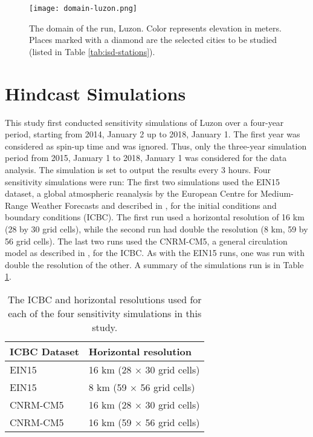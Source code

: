 		\begin{figure}
			\centering
			\texttt{[image: domain-luzon.png]}
			\caption{
				The domain of the run, Luzon.
				Color represents elevation in meters.
				Places marked with a diamond are the selected cities to be studied (listed in Table \ref{tab:isd-stations}).
			}
			\label{fig:domain-luzon}
		\end{figure}	
		
	
\section{Hindcast Simulations}
	This study first conducted sensitivity simulations of Luzon over a four-year period, starting from 2014, January 2 up to 2018, January 1.
	The first year was considered as spin-up time and was ignored.
	Thus, only the three-year simulation period from 2015, January 1 to 2018, January 1 was considered for the data analysis.
	The simulation is set to output the results every 3 hours.
	Four sensitivity simulations were run:
	The first two simulations used the EIN15 dataset, a global
	atmospheric reanalysis by the European Centre for
	Medium-Range Weather Forecasts and described in \textcite{Dee2011}, for the initial conditions and boundary
	conditions (ICBC).
	The first run used a horizontal resolution of 16 km (28 by 30 grid cells), while the second run had double the resolution (8 km, 59 by 56 grid cells).
	The last two runs used the CNRM-CM5, a general circulation model as described in \textcite{Voldoire2012}, for the ICBC.
	As with the EIN15 runs, one was run with double the resolution of the other.
	A summary of the simulations run is in Table \ref{tab:summary-sensitivity-runs}.
	\begin{table}[]
		\caption{The ICBC and horizontal resolutions used for each of the four sensitivity simulations in this study.}
		\label{tab:summary-sensitivity-runs}
		\centering
		\begin{tabular}{ll}
			\hline \hline 
			ICBC Dataset & Horizontal resolution \\
			\hline
			EIN15 & 16 km (28 $\times$ 30 grid cells) \\
			EIN15 & 8 km (59 $\times$ 56 grid cells) \\
			CNRM-CM5 & 16 km (28 $\times$ 30 grid cells) \\
			CNRM-CM5 & 16 km (59 $\times$ 56 grid cells) \\
			\hline
		\end{tabular}
	\end{table}
	
